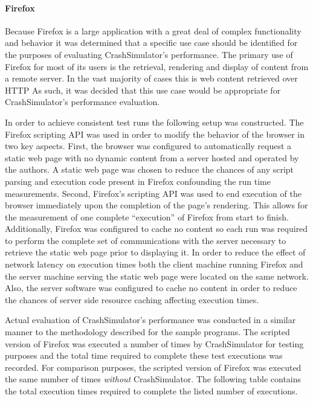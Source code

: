             \paragraph{Firefox}

                Because Firefox is a large application with a great deal of complex functionality and behavior it was
                determined that a specific use case should be identified for the purposes of evaluating CrashSimulator's
                performance. The primary use of Firefox for most of its users is the retrieval, rendering and display of
                content from a remote server. In the vast majority of cases this is web content retrieved over HTTP As
                such, it was decided that this use case would be appropriate for CrashSimulator's performance
                evaluation.

                In order to achieve consistent test runs the following setup was constructed. The Firefox scripting API
                was used in order to modify the behavior of the browser in two key aspects. First, the browser was
                configured to automatically request a static web page with no dynamic content from a server hosted and
                operated by the authors. A static web page was chosen to reduce the chances of any script parsing and
                execution code present in Firefox confounding the run time measurements. Second, Firefox's scripting API
                was used to end execution of the browser immediately upon the completion of the page's rendering. This
                allows for the measurement of one complete ``execution'' of Firefox from start to finish. Additionally,
                Firefox was configured to cache no content so each run was required to perform the complete set of
                communications with the server necessary to retrieve the static web page prior to displaying it. In
                order to reduce the effect of network latency on execution times both the client machine running Firefox
                and the server machine serving the static web page were located on the same network. Also, the server
                software was configured to cache no content in order to reduce the chances of server side resource
                caching affecting execution times.

                Actual evaluation of CrashSimulator's performance was conducted in a similar manner to the methodology
                described for the sample programs. The scripted version of Firefox was executed a number of times by
                CrashSimulator for testing purposes and the total time required to complete these test executions was
                recorded. For comparison purposes, the scripted version of Firefox was executed the same number of times
                \emph{without} CrashSimulator.  The following table contains the total execution times required to
                complete the listed number of executions.

